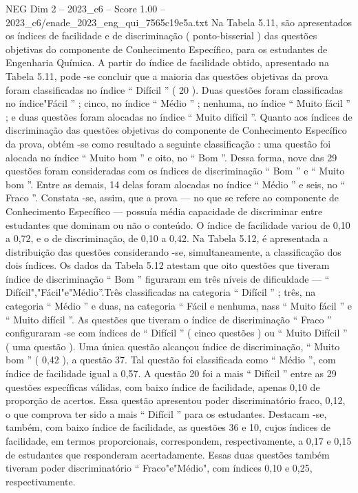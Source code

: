 \begin{textsample}{NEG Dim 2 – 2023\_c6 – Score 1.00 – 2023\_c6/enade\_2023\_eng\_qui\_7565c19e5a.txt}
Na Tabela 5.11, são apresentados os índices de facilidade e de discriminação ( ponto-bisserial ) das questões objetivas do componente de Conhecimento Específico, para os estudantes de Engenharia Química.
A partir do índice de facilidade obtido, apresentado na Tabela 5.11, pode -se concluir que a maioria das questões objetivas da prova foram classificadas no índice “ Difícil ” ( 20 ).
Duas questões foram classificadas no índice"Fácil ” ; cinco, no índice “ Médio ” ; nenhuma, no índice “ Muito fácil ” ; e duas questões foram alocadas no índice “ Muito difícil ”.
Quanto aos índices de discriminação das questões objetivas do componente de Conhecimento Específico da prova, obtém -se como resultado a seguinte classificação : uma questão foi alocada no índice “ Muito bom ” e oito, no “ Bom ”.
Dessa forma, nove das 29 questões foram consideradas com os índices de discriminação “ Bom ” e “ Muito bom ”.
Entre as demais, 14 delas foram alocadas no índice “ Médio ” e seis, no “ Fraco ”.
Constata -se, assim, que a prova — no que se refere ao componente de Conhecimento Específico — possuía média capacidade de discriminar entre estudantes que dominam ou não o conteúdo.
O índice de facilidade variou de 0,10 a 0,72, e o de discriminação, de 0,10 a 0,42.
Na Tabela 5.12, é apresentada a distribuição das questões considerando -se, simultaneamente, a classificação dos dois índices.
Os dados da Tabela 5.12 atestam que oito questões que tiveram índice de discriminação “ Bom ” figuraram em três níveis de dificuldade — “ Difícil","Fácil"e"Médio”.Três classificadas na categoria “ Difícil ” ; três, na categoria “ Médio ” e duas, na categoria “ Fácil e nenhuma, nass “ Muito fácil ” e “ Muito difícil ”.
As questões que tiveram o índice de discriminação “ Fraco ” configuraram -se com índices de “ Difícil ” ( cinco questões ) ou “ Muito Difícil ” ( uma questão ).
Uma única questão alcançou índice de discriminação, “ Muito bom ” ( 0,42 ), a questão 37.
Tal questão foi classificada como “ Médio ”, com índice de facilidade igual a 0,57.
A questão 20 foi a mais “ Difícil ” entre as 29 questões específicas válidas, com baixo índice de facilidade, apenas 0,10 de proporção de acertos.
Essa questão apresentou poder discriminatório fraco, 0,12, o que comprova ter sido a mais “ Difícil ” para os estudantes.
Destacam -se, também, com baixo índice de facilidade, as questões 36 e 10, cujos índices de facilidade, em termos proporcionais, correspondem, respectivamente, a 0,17 e 0,15 de estudantes que responderam acertadamente.
Essas duas questões também tiveram poder discriminatório “ Fraco"e"Médio", com índices 0,10 e 0,25, respectivamente.

\end{textsample}
